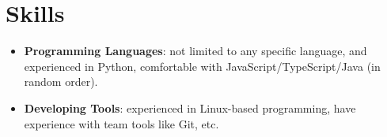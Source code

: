 \documentclass{resume}
\newcommand{\en}[1]{#1}
\newcommand{\zh}[1]{}
\begin{document}
\section{\en{Skills}\zh{技能}}
\begin{itemize}[parsep=0.25ex]
      \item \en{\textbf{Programming Languages}:
                  not limited to any specific language,
                  and experienced in Python,
                  comfortable with JavaScript/TypeScript/Java (in random order).}
            \zh{\textbf{编程语言}:
                  不局限于特定编程语言，且尤其熟悉 JavaScript 等，
                  了解 Java/Python/Kotlin/TypeScript 等（不分先后）。}

      \item \en{\textbf{Developing Tools}:
                  experienced in Linux-based programming,
                  have experience with team tools like Git, etc.}
            \zh{\textbf{开发工具}:
                  十分熟悉 Linux，有 Git 等团队合作工具的经验。}
\end{itemize}
\end{document}
